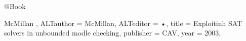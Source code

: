 

@Book{ McMillan ,
ALTauthor = {McMillan},
ALTeditor = {•},
title = {Exploitinh SAT solvers in unbounded modle checking},
publisher = {CAV},
year = {2003},

}

